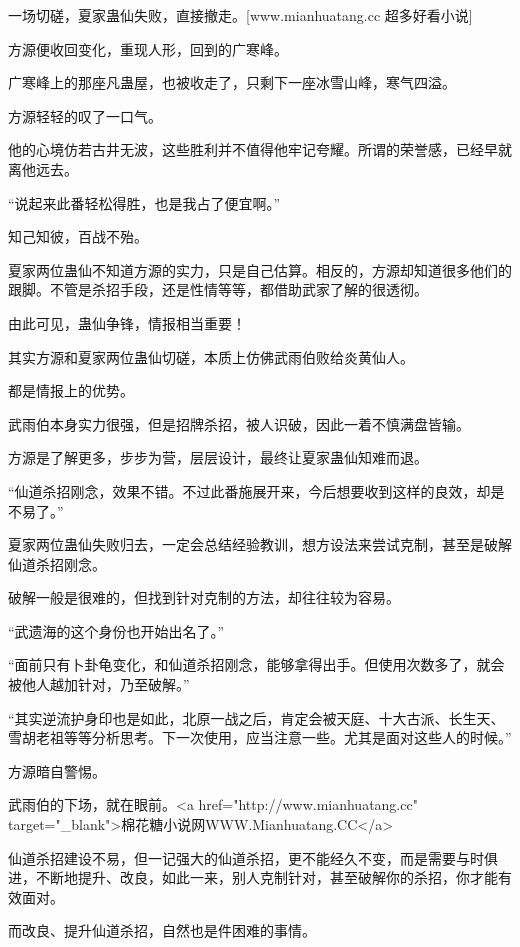 
\begin{this_body}

一场切磋，夏家蛊仙失败，直接撤走。[www.mianhuatang.cc 超多好看小说]

方源便收回变化，重现人形，回到的广寒峰。

广寒峰上的那座凡蛊屋，也被收走了，只剩下一座冰雪山峰，寒气四溢。

方源轻轻的叹了一口气。

他的心境仿若古井无波，这些胜利并不值得他牢记夸耀。所谓的荣誉感，已经早就离他远去。

“说起来此番轻松得胜，也是我占了便宜啊。”

知己知彼，百战不殆。

夏家两位蛊仙不知道方源的实力，只是自己估算。相反的，方源却知道很多他们的跟脚。不管是杀招手段，还是性情等等，都借助武家了解的很透彻。

由此可见，蛊仙争锋，情报相当重要！

其实方源和夏家两位蛊仙切磋，本质上仿佛武雨伯败给炎黄仙人。

都是情报上的优势。

武雨伯本身实力很强，但是招牌杀招，被人识破，因此一着不慎满盘皆输。

方源是了解更多，步步为营，层层设计，最终让夏家蛊仙知难而退。

“仙道杀招刚念，效果不错。不过此番施展开来，今后想要收到这样的良效，却是不易了。”

夏家两位蛊仙失败归去，一定会总结经验教训，想方设法来尝试克制，甚至是破解仙道杀招刚念。

破解一般是很难的，但找到针对克制的方法，却往往较为容易。

“武遗海的这个身份也开始出名了。”

“面前只有卜卦龟变化，和仙道杀招刚念，能够拿得出手。但使用次数多了，就会被他人越加针对，乃至破解。”

“其实逆流护身印也是如此，北原一战之后，肯定会被天庭、十大古派、长生天、雪胡老祖等等分析思考。下一次使用，应当注意一些。尤其是面对这些人的时候。”

方源暗自警惕。

武雨伯的下场，就在眼前。<a href="http://www.mianhuatang.cc" target="\_blank">棉花糖小说网WWW.Mianhuatang.CC</a>

仙道杀招建设不易，但一记强大的仙道杀招，更不能经久不变，而是需要与时俱进，不断地提升、改良，如此一来，别人克制针对，甚至破解你的杀招，你才能有效面对。

而改良、提升仙道杀招，自然也是件困难的事情。


\end{this_body}
